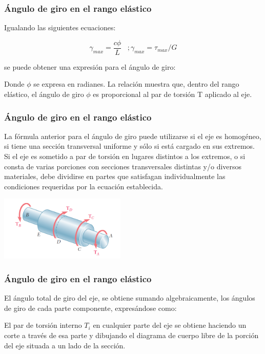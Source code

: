 \documentclass{beamer}
\begin{document}
\begin{frame}
\justifying
\frametitle{Ángulo de giro en el rango elástico}

Igualando las siguientes ecuaciones:

$$ \gamma_{max} = \frac{c\phi}{L}  \,\,\,\,\,; \gamma_{max} = \tau_{max}/G $$

se puede obtener una expresión para el ángulo de giro:

\begin{center}
\end{center}

Donde $\phi$ se expresa en radianes. La relación muestra que, dentro del rango elástico, el 
ángulo de giro $\phi$ es proporcional al par de torsión T aplicado al eje.
\end{frame}


\begin{frame}
\justifying
\frametitle{Ángulo de giro en el rango elástico}

La fórmula anterior para el ángulo de giro puede utilizarse si el eje es homogéneo, si tiene una sección 
transversal uniforme y sólo si está cargado en sus extremos. Si el eje es sometido a par de torsión en 
lugares distintos a los extremos, o si consta de varias porciones con secciones transversales distintas y/o 
diversos materiales, debe dividirse en partes que satisfagan individualmente las condiciones 
requeridas por la ecuación establecida.
\begin{center}
\includegraphics[width=0.45\textwidth]{img/multiple_section_shaft.PNG}
\end{center}
\end{frame}



\begin{frame}
\justifying
\frametitle{Ángulo de giro en el rango elástico}

El ángulo total de giro del eje, se obtiene sumando algebraicamente, los ángulos de giro de cada parte 
componente, expresándose como:

\begin{center}
\end{center}

El par de torsión interno $T_i$ en cualquier parte del eje se obtiene haciendo un corte a través de esa parte 
y dibujando el diagrama de cuerpo libre de la porción del eje situada a un lado de la sección.
\end{frame}
\end{document}
